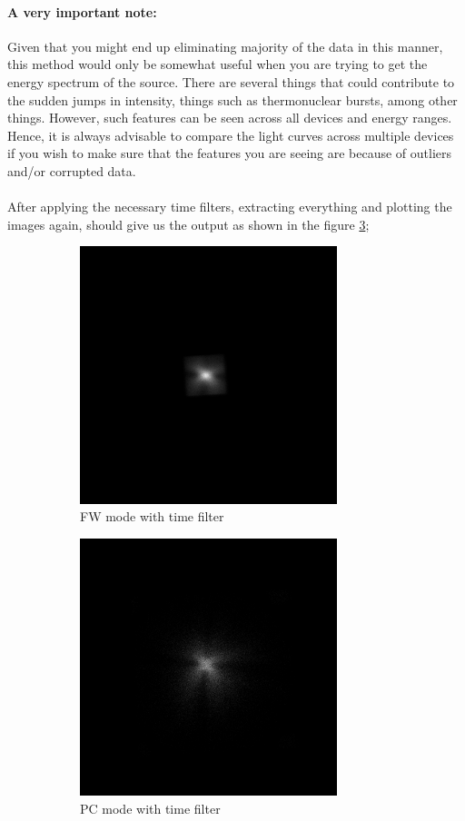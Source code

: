 \documentclass[a4paper,twoside]{report}
\numberwithin{equation}{section}
\begin{document}
\paragraph{A very important note:}
Given that you might end up eliminating majority of the data in this manner, this method would only be somewhat useful when you are trying to get the energy spectrum of the source. There are several things that could contribute to the sudden jumps in intensity, things such as thermonuclear bursts, among other things. However, such features can be seen across all devices and energy ranges. Hence, it is always advisable to compare the light curves across multiple devices if you wish to make sure that the features you are seeing are because of outliers and/or corrupted data. 
\paragraph{}
After applying the necessary time filters, extracting everything and plotting the images again, should give us the output as shown in the figure \ref{Good_FW_and_PC};
\begin{figure}[h]
\begin{subfigure}{0.48\textwidth}
\includegraphics[width=1.0\linewidth, height=7.5cm]{FWF1_t.jpeg} 
\caption{FW mode with time filter}
\label{FW_Good}
\end{subfigure}
\begin{subfigure}{0.48\textwidth}
\includegraphics[width=1.0\linewidth, height=7.5cm]{PC_filt.jpeg}
\caption{PC mode with time filter}
\label{PC_Good}
\end{subfigure}
\caption{}
\label{Good_FW_and_PC}
\end{figure}
\newpage
\end{document}
